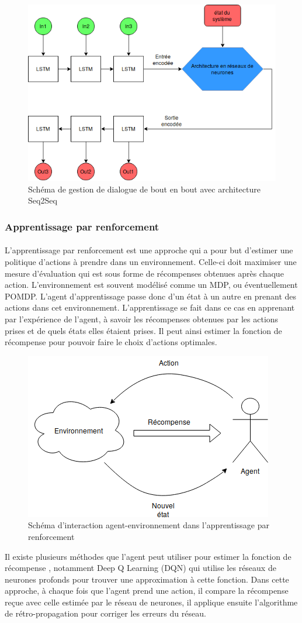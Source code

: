 \begin{figure}[H]
	\centering
	\includegraphics[width=.7\linewidth]{images/DM/DMSeq2Seq.png} 
	\caption{Schéma de gestion de dialogue de bout en bout avec architecture Seq2Seq} 
\end{figure}
\subsubsection{Apprentissage par renforcement} \label{reinf_learning}
\paragraph{}
L’apprentissage par renforcement est une approche qui a pour but d’estimer une politique d’actions à prendre dans un environnement. Celle-ci doit maximiser une mesure d’évaluation qui est sous forme de récompenses obtenues après chaque action\cite{Weisz2018}. L’environnement est souvent modélisé comme un MDP, ou éventuellement POMDP. L’agent d’apprentissage passe donc d’un état à un autre en prenant des actions dans cet environnement. L’apprentissage se fait dans ce cas en apprenant par l’expérience de l’agent, à savoir les récompenses obtenues par les actions prises et de quels états elles étaient prises. Il peut ainsi estimer la fonction de récompense pour pouvoir faire le choix d’actions optimales. 

\begin{figure}[H]
	\centering
	\includegraphics[width=.5\linewidth]{images/DM/RLSchema.png} 
	\caption{Schéma d'interaction agent-environnement dans l'apprentissage par renforcement} 
\end{figure}
Il existe plusieurs méthodes que l’agent peut utiliser pour estimer la fonction de récompense \cite{Dimitri2012}, notamment Deep Q Learning (DQN) \cite{Mnih2015} qui utilise les réseaux de neurones profonds pour trouver une approximation à cette fonction. Dans cette approche, à chaque fois que l'agent prend une action, il compare la récompense reçue avec celle estimée par le réseau de neurones, il applique ensuite l'algorithme de rétro-propagation pour corriger les erreurs du réseau. 

